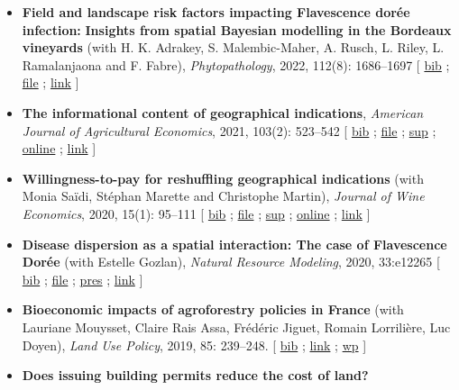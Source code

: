 \documentclass[12pt, a4paper]{./style}
\begin{document}
\begin{itemize}
{Aquitaine region} (with N. A. Andriamanantena,
C. Gaufreteau and L. Doyen), \emph{Regional Environmental
Change}, 2022, 22(3): 1--15 [ \href{bib/CDSA.bib}{bib} ; \href{doc/CDSA-FILE.pdf}{file} ; \href{doc/CDSA-SUP.pdf}{sup} ; \href{https://link.springer.com/article/10.1007/s10113-022-01964-6}{link}
].
\item \textbf{Field and landscape risk factors impacting Flavescence
dorée infection:} \textbf{Insights from spatial Bayesian
modelling in the Bordeaux vineyards} (with
H. K. Adrakey, S. Malembic-Maher, A. Rusch, L. Riley,
L. Ramalanjaona and F. Fabre), \emph{Phytopathology}, 2022,
112(8): 1686--1697 [ \href{bib/MDFD.bib}{bib} ; \href{doc/MDFD-FILE.pdf}{file} ; \href{https://apsjournals.apsnet.org/doi/10.1094/PHYTO-10-21-0449-R}{link} ]
\item \textbf{The informational content of geographical
indications}, \emph{American Journal of Agricultural
Economics}, 2021, 103(2): 523--542 [ \href{bib/GEOIND.bib}{bib} ; \href{doc/GEOIND-FILE.pdf}{file} ; \href{doc/GEOIND-SUP.pdf}{sup} ;
\href{https://github.com/jsay/geoInd/}{online} ; \href{https://onlinelibrary.wiley.com/doi/full/10.1111/ajae.12100}{link} ]
\item \textbf{Willingness-to-pay for reshuffling geographical
indications} (with Monia Saïdi, Stéphan Marette and
Christophe Martin), \emph{Journal of Wine Economics}, 2020,
15(1): 95--111 [ \href{bib/RFGI.bib}{bib} ; \href{doc/RFGI-FILE.pdf}{file} ; \href{doc/RFGI-SUP.pdf}{sup} ; \href{https://github.com/jsay/reshufGI/}{online} ; \href{https://www.cambridge.org/core/journals/journal-of-wine-economics/article/abs/willingnesstopay-for-reshuffling-geographical-indications/FD4DB1BCA54C1E204773BF861965BEBD}{link} ]
\item \textbf{Disease dispersion as a spatial interaction: The case
of Flavescence Dorée} (with Estelle Gozlan), \emph{Natural
Resource Modeling}, 2020, 33:e12265 [ \href{bib/SPFD.bib}{bib} ; \href{doc/SPFD-FILE.pdf}{file} ; \href{doc/SPFD-PRES.pdf}{pres}
; \href{https://onlinelibrary.wiley.com/doi/full/10.1111/nrm.12265}{link} ]
\item \textbf{Bioeconomic impacts of agroforestry policies in
France} (with Lauriane Mouysset, Claire Rais Assa,
Frédéric Jiguet, Romain Lorrilière, Luc Doyen), \emph{Land
Use Policy}, 2019, 85: 239--248.  [ \href{bib/BIOFOR.bib}{bib} ; \href{https://www.sciencedirect.com/science/article/abs/pii/S0264837718308160}{link} ; \href{http://cahiersdugretha.u-bordeaux4.fr/2017/2017-05.pdf}{wp} ]
\item \textbf{Does issuing building permits reduce the cost of land?
}
\end{itemize}
\end{document}
